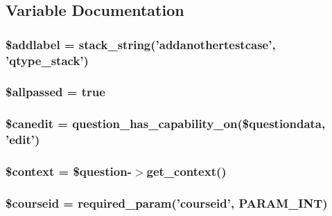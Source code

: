 \subsection{Variable Documentation}
\hypertarget{questiontestrun_8php_a4bd0883974ba272756b00624f6ebcf5d}{
\subsubsection[{\$addlabel}]{\setlength{\rightskip}{0pt plus 5cm}\$addlabel = stack\_\-string('addanothertestcase', '{\bf qtype\_\-stack}')}}
\label{questiontestrun_8php_a4bd0883974ba272756b00624f6ebcf5d}
\hypertarget{questiontestrun_8php_ab5a10be91c162cb48ac439a779b80046}{
\subsubsection[{\$allpassed}]{\setlength{\rightskip}{0pt plus 5cm}\$allpassed = true}}
\label{questiontestrun_8php_ab5a10be91c162cb48ac439a779b80046}
\hypertarget{questiontestrun_8php_a69bfd8cbfcb5df8b71b7aa810fd0f55f}{
\subsubsection[{\$canedit}]{\setlength{\rightskip}{0pt plus 5cm}\$canedit = question\_\-has\_\-capability\_\-on(\$questiondata, 'edit')}}
\label{questiontestrun_8php_a69bfd8cbfcb5df8b71b7aa810fd0f55f}
\hypertarget{questiontestrun_8php_ae05dedb802ada0155efdece2044fed64}{
\subsubsection[{\$context}]{\setlength{\rightskip}{0pt plus 5cm}\$context = \$question-\/$>$get\_\-context()}}
\label{questiontestrun_8php_ae05dedb802ada0155efdece2044fed64}
\hypertarget{questiontestrun_8php_a2a1b481ca3e5ae5c2d7a66d271302f23}{
\subsubsection[{\$courseid}]{\setlength{\rightskip}{0pt plus 5cm}\$courseid = required\_\-param('courseid', PARAM\_\-INT)}}
